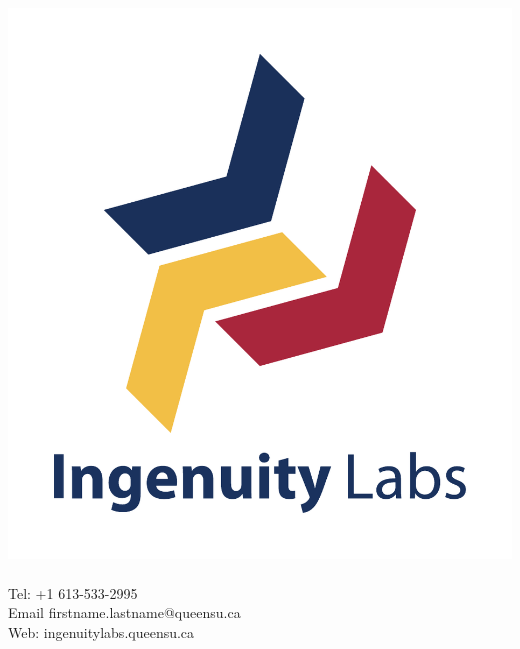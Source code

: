 \documentclass[fleqn]{ingenuitylabs-slides}
\begin{document}

\SlideWhite
\begin{frame}
    \begin{columns}
        \centering
        \includegraphics[width=\textwidth]{figs/ingenuitylabs-logo-colourful.pdf}
        {\large\bf \insertauthor} \\
        \insertinstitute \\
        Tel: +1 613-533-2995 \\
        Email firstname.lastname@queensu.ca \\
        Web: ingenuitylabs.queensu.ca
    \end{columns}
\end{frame}

\end{document}
